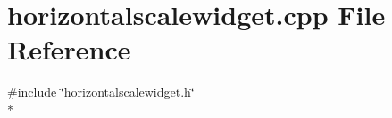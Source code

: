 \section{horizontalscalewidget.\+cpp File Reference}
\label{bk3_2horizontalscalewidget_8cpp}
{\ttfamily \#include \char`\"{}horizontalscalewidget.\+h\char`\"{}}\\*

